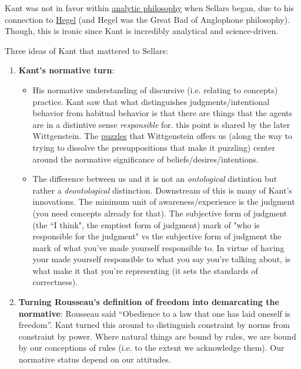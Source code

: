Kant was not in favor within \href{https://en.wikipedia.org/wiki/Analytic_philosophy}{analytic philosophy} when Sellars began, due to his connection to \href{doc/2 phil/People/Brandom/Slogans/On Kant and Hegel}{Hegel} (and Hegel was the Great Bad of Anglophone philosophy). Though, this is ironic since Kant is incredibly analytical and science-driven.

Three ideas of Kant that mattered to Sellars:
\begin{enumerate}
\item \textbf{Kant's normative turn}:
\begin{itemize}
\item His normative understanding of discursive (i.e. relating to concepts) practice. Kant saw that what distinguishes judgments/intentional behavior from habitual behavior is that there are things that the agents are in a distintive sense \emph{responsible} for. this point is shared by the later Wittgenstein. The \href{doc/phil/Phil Situations/Childrens Game}{puzzles} that Wittgenstein offers us (along the way to trying to dissolve the presuppositions that make it puzzling) center around the normative significance of beliefs/desires/intentions.

\item The difference between us and it is not an \emph{ontological} distintion but rather a \emph{deontological} distinction. Downstream of this is many of Kant's innovations. The minimum unit of awareness/experience is the judgment (you need concepts already for that). The subjective form of judgment (the ``I think", the emptiest form of judgment) mark of "who is responsible for the judgment" vs the subjective form of judgment the mark of what you've made yourself responsible to. In virtue of having your made yourself responsible to what you say you're talking about, is what make it that you're representing (it sets the standards of correctness).
\end{itemize}

\item \textbf{Turning Rousseau's definition of freedom into demarcating the normative}: Rousseau said ``Obedience to a law that one has laid oneself is freedom''. Kant turned this around to distinguish constraint by norms from constraint by power. Where natural things are bound by rules, we are bound by our conceptions of rules (i.e. to the extent we acknowledge them). Our normative status depend on our attitudes.


\end{enumerate}
